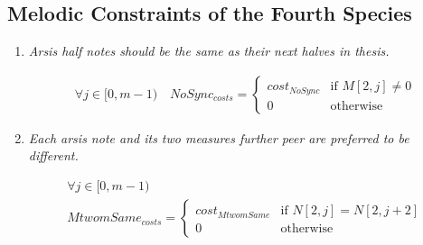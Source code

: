 \subsection*{Melodic Constraints of the Fourth Species}
\begin{enumerate}[wide, label=\bfseries 4.M\arabic*]
  \item\label{rule:fullsyncopations} {\textit{Arsis half notes should be the same as their next halves in thesis.}}


\begin{equation}
    \begin{gathered}
        \forall j \in [0, m-1) \quad
        NoSync_{costs} = \begin{cases}
            cost_{NoSync} & \text{if } M[2, j] \neq 0\\
            0 & \text{otherwise}
        \end{cases}
    \end{gathered}
\end{equation}

\item\label{rule:m2same} {\textit{Each arsis note and its two measures further peer are preferred to be different.}}


\begin{equation}
    \begin{gathered}
        \forall j \in [0, m-1)\\
        MtwomSame_{costs} = \begin{cases}
            cost_{MtwomSame} & \text{if } N[2, j] = N[2, j+2]\\
            0 & \text{otherwise}
        \end{cases}
    \end{gathered}
\end{equation}

\end{enumerate}


